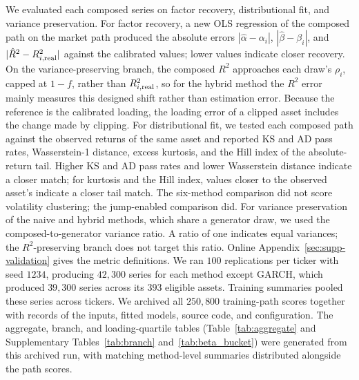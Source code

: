 We evaluated each composed series on factor recovery, distributional
fit, and variance preservation. For factor recovery, a new OLS
regression of the composed path on the market path produced the
absolute errors $|\hat\alpha-\alpha_i|$, $|\hat\beta-\beta_i|$, and
$|\hat R^2-R^2_{i,\mathrm{real}}|$
against the calibrated values; lower values indicate closer recovery.
On the variance-preserving branch, the composed $R^2$ approaches each
draw's $\rho_i$, capped at $1-f$, rather than $R^2_{i,\mathrm{real}}$, so for
the hybrid method the $R^2$ error mainly measures this designed shift
rather than estimation error.
Because the reference is the calibrated loading, the loading error of
a clipped asset includes the change made by clipping. For distributional fit, we tested each composed path against the
observed returns of the same asset and reported KS and AD pass rates,
Wasserstein-1 distance, excess kurtosis, and the Hill index of the
absolute-return tail. Higher KS and AD pass rates and lower Wasserstein distance indicate a
closer match; for kurtosis and the Hill index, values closer to the observed asset's indicate a closer tail
match. The six-method comparison did not score volatility clustering;
the jump-enabled comparison did. For variance preservation of the naive and hybrid methods, which share
a generator draw, we used the composed-to-generator variance ratio. A
ratio of one indicates equal variances; the $R^2$-preserving branch
does not target this ratio.
Online Appendix~\ref{sec:supp-validation} gives the metric definitions.
We ran $100$ replications per ticker with seed $1234$, producing $42{,}300$ series for each method except GARCH, which
produced $39{,}300$ series across its $393$ eligible assets. Training
summaries pooled these series across tickers.
We archived all $250{,}800$ training-path scores together with records
of the inputs, fitted models, source code, and configuration. The
aggregate, branch, and loading-quartile tables
(Table~\ref{tab:aggregate} and Supplementary Tables~\ref{tab:branch}
and~\ref{tab:beta_bucket}) were generated from this archived run, with matching method-level summaries distributed
alongside the path scores.

